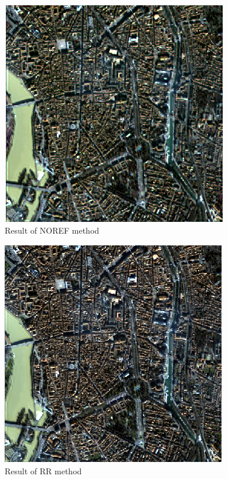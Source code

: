 \documentclass[12pt]{report}
\begin{document}
\begin{figure}
    \centering
    \includegraphics[scale=.8]{NOREF.png}
    \caption{Result of NOREF method}
    \label{fig:comparison_noref}
\end{figure}

\begin{figure}
    \centering
    \includegraphics[scale=.8]{RR.png}
    \caption{Result of RR method}
    \label{fig:comparison_rr}
\end{figure}
\end{document}
